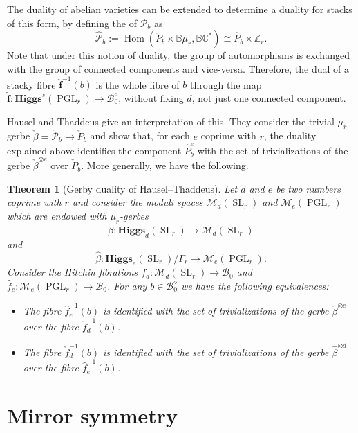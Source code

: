 \documentclass[12pt,a4paper]{amsbook}
\newtheorem{thm}{Theorem}[chapter]
\theoremstyle{remark} \newtheorem{rmk}[thm]{Remark}
\theoremstyle{definition} \newtheorem{defn}[thm]{Definition}
\theoremstyle{definition} \newtheorem{ex}[thm]{Example}
\theoremstyle{definition} \newtheorem{ej}{Exercise}
\let\emph\relax
\newcommand{\C}{\mathbb C}
\newcommand{\Z}{\mathbb Z}
\newcommand{\bbB}{\mathbb B}
\newcommand{\cB}{\mathcal B}
\newcommand{\cM}{\mathcal M}
\newcommand{\cP}{\mathcal P}
\DeclareMathOperator{\Hom}{Hom}
\DeclareMathOperator{\SL}{SL}
\DeclareMathOperator{\PGL}{PGL}
\begin{document}
The duality of abelian varieties can be extended to determine a duality for stacks of this form, by defining the \emph{dual stack} of $\check{\cP}_b$ as
\begin{equation*}
\hat{\cP}_b := \Hom(\check{P}_b \times \bbB \mu_r, \bbB \C^*) \cong \hat{P}_b \times \Z_r.
\end{equation*}
Note that under this notion of duality, the group of automorphisms is exchanged with the group of connected components and vice-versa. Therefore, the dual of a stacky fibre $\hat{\bm{f}}^{-1}(b)$ is the whole fibre of $b$ through the map $\hat{\bm{f}}: \mathbf{Higgs}^s(\PGL_r)\rightarrow \cB^{\diamond}_0$, without fixing $d$, not just one connected component.

Hausel and Thaddeus \cite{HauselThaddeus} give an interpretation of this. They consider the trivial $\mu_r$-gerbe $\check{\beta}=\check{\cP}_b\rightarrow \check{P}_b$ and show that, for each $e$ coprime with $r$, the duality explained above identifies the component $\hat{P}_b^e$ with the set of trivializations of the gerbe $\check{\beta}^{\otimes e}$ over $\check{P}_b$. More generally, we have the following.

\begin{thm}[Gerby duality of Hausel--Thaddeus]
  Let $d$ and $e$ be two numbers coprime with $r$ and consider the moduli spaces $\cM_d(\SL_r)$ and $\cM_e(\PGL_r)$ which are endowed with $\mu_r$-gerbes \[\check{\beta}:\mathbf{Higgs}_d(\SL_r) \rightarrow \cM_d(\SL_r)\] and \[\hat{\beta}: \mathbf{Higgs}_e(\SL_r)/\Gamma_r \rightarrow \cM_e(\PGL_r).\] Consider the Hitchin fibrations $\check{f}_d:\cM_d(\SL_r) \rightarrow \cB_0$ and $\hat{f}_e: \cM_e(\PGL_r)\rightarrow \cB_0$.
  For any $b\in \cB_0^\diamond$ we have the following equivalences:
\begin{itemize}
\item The fibre $\hat{f}_e^{-1}(b)$ is identified with the set of trivializations of the gerbe $\check{\beta}^{\otimes e}$ over the fibre $\check{f}_d^{-1}(b)$.
\item The fibre $\check{f}_d^{-1}(b)$ is identified with the set of trivializations of the gerbe $\hat{\beta}^{\otimes d}$ over the fibre $\hat{f}_e^{-1}(b)$.
\end{itemize}
\end{thm}

\section{Mirror symmetry}
\end{document}
